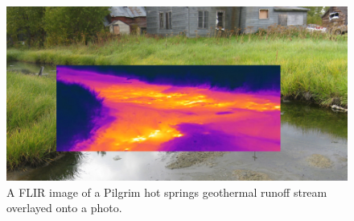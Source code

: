 \begin{figure}[h]
	\centering
	\caption{A FLIR image of a Pilgrim hot springs geothermal runoff stream overlayed onto a photo.}
	\label{fig:pilgrimFLIR}
	
	\includegraphics[width=\textwidth]{figures/PilgrimFLIR.png} 


\end{figure}